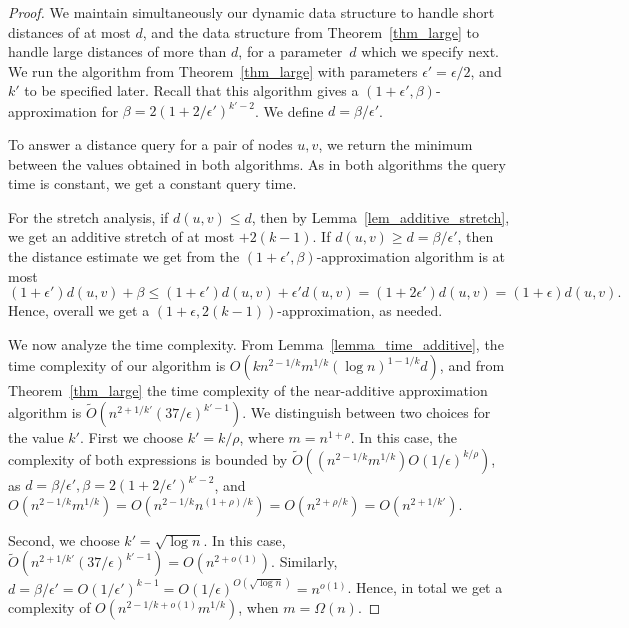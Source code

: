 \begin{proof}
We maintain simultaneously our dynamic data structure to handle short distances of at most $d$, and the data structure from Theorem~\ref{thm_large} to handle large distances of more than $d$, for a parameter~$d$ which we specify next. We run the algorithm from Theorem~\ref{thm_large} with parameters $\epsilon' = \epsilon/2$, and $k'$ to be specified later. Recall that this algorithm gives a $(1+\epsilon', \beta)$-approximation for $\beta= 2(1+2/\epsilon')^{k'-2}$. We define $d=\beta/\epsilon'$.

To answer a distance query for a pair of nodes $u,v$, we return the minimum between the values obtained in both algorithms. As in both algorithms the query time is constant, we get a constant query time. 

For the stretch analysis, if $d(u,v) \leq d$, then by Lemma~\ref{lem_additive_stretch}, we get an additive stretch of at most $+2(k-1)$. If $d(u,v) \geq d = \beta/\epsilon'$, then the distance estimate we get from the $(1+\epsilon',\beta)$-approximation algorithm is at most $$(1+\epsilon')d(u,v) + \beta \leq (1+\epsilon')d(u,v) + \epsilon' d(u,v) = (1+2\epsilon')d(u,v)=(1+\epsilon)d(u,v).$$
Hence, overall we get a $(1+\epsilon,2(k-1))$-approximation, as needed.

We now analyze the time complexity. From Lemma~\ref{lemma_time_additive}, the time complexity of our algorithm is $O(kn^{2-1/k}m^{1/k}(\log{n})^{1-1/k} d)$, and from Theorem~\ref{thm_large} the time complexity of the near-additive approximation algorithm is $\tilde{O}(n^{2+1/k'} (37/\epsilon)^{k'-1})$.
We distinguish between two choices for the value $k'$. First we choose $k' = k/\rho$, where $m=n^{1+\rho}$. In this case, the complexity of both expressions is bounded by $\tilde{O}((n^{2-1/k}m^{1/k}) O(1/\epsilon)^{k/\rho})$, as $d=\beta/\epsilon', \beta= 2(1+2/\epsilon')^{k'-2}$, and $O(n^{2-1/k}m^{1/k})=O(n^{2-1/k}n^{(1+\rho)/k})=O(n^{2+\rho/k})=O(n^{2+1/k'})$.

Second, we choose $k' = \sqrt{\log{n}}$. In this case, $\tilde{O}(n^{2+1/k'} (37/\epsilon)^{k'-1})= O(n^{2+o(1)})$. Similarly, $d= \beta/\epsilon' = O(1/\epsilon')^{k-1}= O(1/\epsilon)^{O(\sqrt{\log{n}})}=n^{o(1)}$. Hence, in total we get a complexity of $O(n^{2-1/k+o(1)}m^{1/k})$, when $m=\Omega(n)$.
\end{proof}




